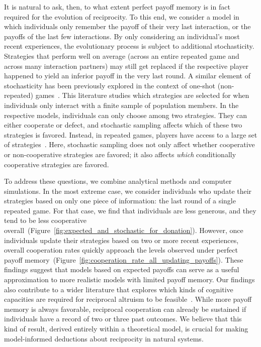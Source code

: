\documentclass[11pt]{article}
\newcommand{\FigBaseResults}{Figure~\ref{fig:expected_and_stochastic_for_donation}}
\newcommand{\FigHigherMemory}{Figure~\ref{fig:cooperation_rate_all_updating_payoffs}}
\theoremstyle{plainCl1}
\theoremstyle{plainCl2}
\begin{document}
It is natural to ask, then, to what extent perfect payoff memory is in fact required for the evolution of reciprocity. 
To this end, we consider a model in which individuals only remember the payoff of their very last interaction, or the payoffs of the last few interactions. 
By only considering an individual's most recent experiences, the evolutionary process is subject to additional stochasticity. 
Strategies that perform well on average (across an entire repeated game and across many interaction partners) may still get replaced if the respective player happened to yield an inferior payoff in the very last round. 
A similar element of stochasticity has been previously explored in the context of one-shot (non-repeated) games~\citep{sanchez:JTB:2005,roca:PhysicalReview:2006,Traulsen:JTB:2007,Woelfing:JTB:2009,Hauert:PRE:2018}. 
This literature studies which strategies are selected for when individuals only interact with a finite sample of population members. 
In the respective models, individuals can only choose among two strategies. 
They can either cooperate or defect, and stochastic sampling affects which of these two strategies is favored. 
Instead, in repeated games, players have access to a large set of strategies~\citep[in our case, all reactive strategies;][]{nowak:APC:1989}. 
Here, stochastic sampling does not only affect whether cooperative or non-cooperative strategies are favored; it also affects {\it which} conditionally cooperative strategies are favored. 

To address these questions, we combine analytical methods and computer simulations. 
In the most extreme case, we consider individuals who update their strategies based on only one piece of information:  the last round of a single repeated game. 
For that case, we find that individuals are less generous, and they tend to be less cooperative overall~(\FigBaseResults). 
However, once individuals update their strategies based on two or more recent experiences, overall cooperation rates quickly approach the levels observed under perfect payoff memory~(\FigHigherMemory). 
These findings suggest that models based on expected payoffs can serve as a useful approximation to more realistic models with limited payoff memory. 
Our findings also contribute to a wider literature that explores which kinds of cognitive capacities are required for reciprocal altruism to be feasible~\citep[e.g.,][]{Stevens:fip:2011,Volstorf:PlosOne:2011}. 
While more payoff memory is always favorable, reciprocal cooperation can already be sustained if individuals have a record of two or three past outcomes. We believe that this kind of result, derived entirely within a theoretical model, is crucial for making model-informed deductions about reciprocity in natural systems.\\[0.5cm]
\end{document}
